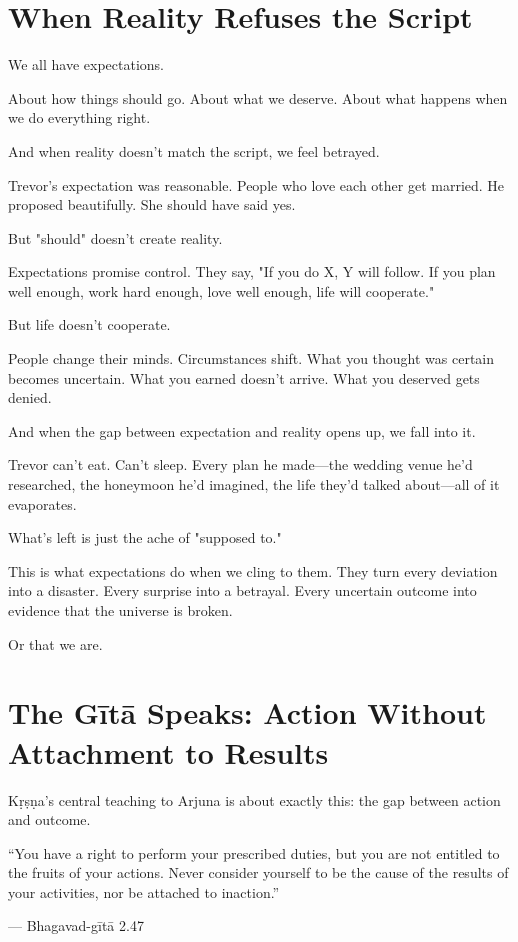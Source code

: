 \documentclass[11pt,twoside]{book}
\begin{document}
\section*{When Reality Refuses the Script}

We all have expectations.

About how things should go. About what we deserve. About what happens when we do everything right.

And when reality doesn't match the script, we feel betrayed.

Trevor's expectation was reasonable. People who love each other get married. He proposed beautifully. She should have said yes.

But "should" doesn't create reality.

Expectations promise control. They say, "If you do X, Y will follow. If you plan well enough, work hard enough, love well enough, life will cooperate."

But life doesn't cooperate.

People change their minds. Circumstances shift. What you thought was certain becomes uncertain. What you earned doesn't arrive. What you deserved gets denied.

And when the gap between expectation and reality opens up, we fall into it.

Trevor can't eat. Can't sleep. Every plan he made—the wedding venue he'd researched, the honeymoon he'd imagined, the life they'd talked about—all of it evaporates.

What's left is just the ache of "supposed to."

This is what expectations do when we cling to them. They turn every deviation into a disaster. Every surprise into a betrayal. Every uncertain outcome into evidence that the universe is broken.

Or that we are.

\section*{The Gītā Speaks: Action Without Attachment to Results}

Kṛṣṇa's central teaching to Arjuna is about exactly this: the gap between action and outcome.

\begin{pullquote}
``You have a right to perform your prescribed duties, but you are not entitled to the fruits of your actions. Never consider yourself to be the cause of the results of your activities, nor be attached to inaction.''

--- Bhagavad-gītā 2.47
\end{pullquote}
\end{document}
